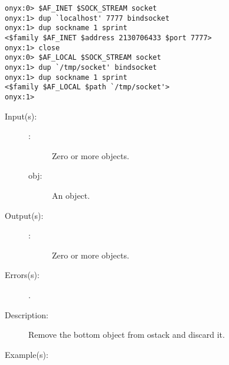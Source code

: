 \begin{description}
\begin{description}
\begin{verbatim}
onyx:0> $AF_INET $SOCK_STREAM socket
onyx:1> dup `localhost' 7777 bindsocket
onyx:1> dup sockname 1 sprint
<$family $AF_INET $address 2130706433 $port 7777>
onyx:1> close
onyx:0> $AF_LOCAL $SOCK_STREAM socket
onyx:1> dup `/tmp/socket' bindsocket
onyx:1> dup sockname 1 sprint
<$family $AF_LOCAL $path `/tmp/socket'>
onyx:1>
		\end{verbatim}
	\end{description}
\label{systemdict:bpop}
\item[{\onyxop{obj \commas}{bpop}{\commas}}: ]
	\begin{description}\item[]
	\item[Input(s): ]
		\begin{description}\item[]
		\item[\commas: ]
			Zero or more objects.
		\item[obj: ]
			An object.
		\end{description}
	\item[Output(s): ]
		\begin{description}\item[]
		\item[\commas: ]
			Zero or more objects.
		\end{description}
	\item[Errors(s): ]
		\begin{description}\item[]
		\item[.]
		\end{description}
	\item[Description: ]
		Remove the bottom object from ostack and discard it.
	\item[Example(s): ]\begin{verbatim}


\end{verbatim}
\end{description}
\end{description}
